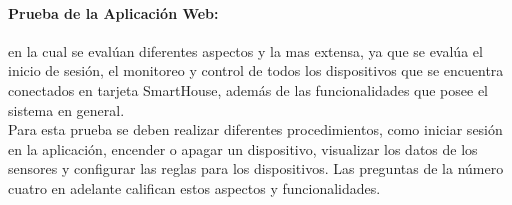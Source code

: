 \paragraph{Prueba de la Aplicación Web:} en la cual se evalúan diferentes aspectos y la mas extensa, ya que se evalúa el inicio de sesión, el monitoreo y control de todos los dispositivos que se encuentra conectados en tarjeta SmartHouse, además de las funcionalidades que posee el sistema en general.\\

Para esta prueba se deben realizar diferentes procedimientos, como iniciar sesión en la aplicación, encender o apagar un dispositivo, visualizar los datos de los sensores y configurar las reglas para los dispositivos. Las preguntas de la número cuatro en adelante califican estos aspectos y funcionalidades.\\